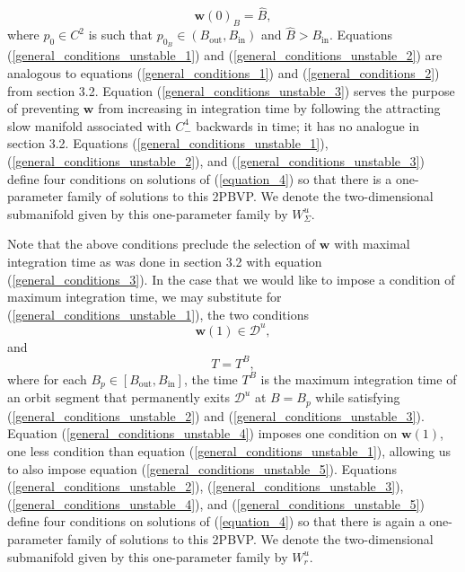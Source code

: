 \documentclass{ws-ijbc}
\begin{document}
\begin{equation}
	\mathbf{w}(0)_B = \widehat{B},
	\label{general_conditions_unstable_3}
\end{equation}
where $p_0 \in C^2$ is such that $p_{0_B} \in (B_{\text{out}}, B_{\text{in}})$ and $\widehat{B}>B_{\text{in}}$.  Equations (\ref{general_conditions_unstable_1}) and (\ref{general_conditions_unstable_2}) are analogous to equations (\ref{general_conditions_1}) and (\ref{general_conditions_2}) from section 3.2.  Equation (\ref{general_conditions_unstable_3}) serves the purpose of preventing $\mathbf{w}$ from increasing in integration time by following the attracting slow manifold associated with $C^4_-$ backwards in time; it has no analogue in section 3.2.    Equations (\ref{general_conditions_unstable_1}), (\ref{general_conditions_unstable_2}), and (\ref{general_conditions_unstable_3}) define four conditions on solutions of (\ref{equation_4}) so that there is a one-parameter family of solutions to this 2PBVP.  We denote the two-dimensional submanifold given by this one-parameter family by $W^u_\Sigma$.

Note that the above conditions preclude the selection of $\mathbf{w}$ with maximal integration time as was done in section 3.2 with equation (\ref{general_conditions_3}).  In the case that we would like to impose a condition of maximum integration time, we may substitute for (\ref{general_conditions_unstable_1}), the two conditions
\begin{equation}
	\mathbf{w}(1) \in \mathscr{D}^u,
	\label{general_conditions_unstable_4}
\end{equation}
and
\begin{equation}
	T = T^B,
	\label{general_conditions_unstable_5}
\end{equation}
where for each $B_p \in [B_{\text{out}}, B_{\text{in}}]$, the time $T^B$ is the maximum integration time of an orbit segment that permanently exits $\mathscr{D}^u$ at $B = B_p$ while satisfying (\ref{general_conditions_unstable_2}) and (\ref{general_conditions_unstable_3}).  Equation (\ref{general_conditions_unstable_4}) imposes one condition on $\mathbf{w}(1)$, one less condition than equation (\ref{general_conditions_unstable_1}), allowing us to also impose equation (\ref{general_conditions_unstable_5}).  Equations (\ref{general_conditions_unstable_2}), (\ref{general_conditions_unstable_3}), (\ref{general_conditions_unstable_4}), and (\ref{general_conditions_unstable_5}) define four conditions on solutions of (\ref{equation_4}) so that there is again a one-parameter family of solutions to this 2PBVP.  We denote the two-dimensional submanifold given by this one-parameter family by $W^u_r$.
\end{document}

